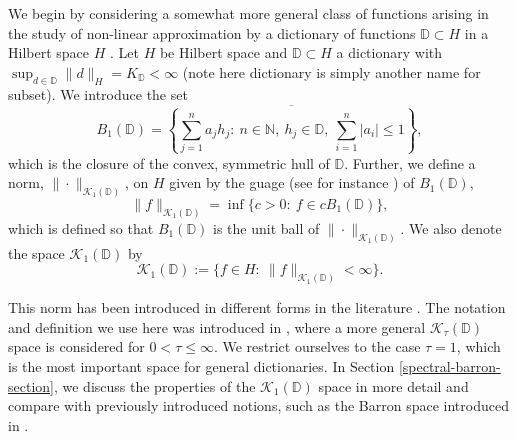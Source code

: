 We begin by considering a somewhat more general class of functions arising in the study of non-linear approximation by a dictionary of functions $\mathbb{D}\subset H$ in a Hilbert space $H$ \cite{devore1998nonlinear,barron2008approximation}. Let $H$ be Hilbert space and $\mathbb{D}\subset H$ a dictionary with $\sup_{d\in \mathbb{D}} \|d\|_H = K_\mathbb{D} < \infty$ (note here dictionary is simply another name for subset). 
We introduce the set
\begin{equation}\label{unit-ball-definition}
 B_1(\mathbb{D}) = \overline{\left\{\sum_{j=1}^n a_jh_j:~n\in \mathbb{N},~h_j\in \mathbb{D},~\sum_{i=1}^n|a_i|\leq 1\right\}},
\end{equation}
which is the closure of the convex, symmetric hull of $\mathbb{D}$. Further, we define a norm, $\|\cdot\|_{\mathcal{K}_1(\mathbb{D})}$, on $H$ given by the guage (see for instance \cite{rockafellar1970convex}) of $B_1(\mathbb{D})$,
\begin{equation}\label{norm-definition}
 \|f\|_{\mathcal{K}_1(\mathbb{D})} = \inf\{c > 0:~f\in cB_1(\mathbb{D})\},
\end{equation}
which is defined so that $B_1(\mathbb{D})$ is the unit ball of $\|\cdot\|_{\mathcal{K}_1(\mathbb{D})}$. We also denote the space $\mathcal{K}_1(\mathbb{D})$ by 
\begin{equation}\label{space-definition}
\mathcal{K}_1(\mathbb{D}) := \{f\in H:~\|f\|_{\mathcal{K}_1(\mathbb{D})} < \infty\}.
\end{equation}

This norm has been introduced in different forms in the literature \cite{devore1998nonlinear,kurkova2001bounds,kurkova2002comparison,barron2008approximation}.  The notation and definition we use here was introduced in \cite{devore1998nonlinear}, where a more general $\mathcal{K}_\tau(\mathbb{D})$ space is considered for $0<\tau\leq \infty$. We restrict ourselves to the  case $\tau = 1$, which is the most important space for general dictionaries. In Section \ref{spectral-barron-section}, we discuss the properties of the $\mathcal{K}_1(\mathbb{D})$ space in more detail and compare with previously introduced notions, such as the Barron space introduced in \cite{ma2019barron}.

